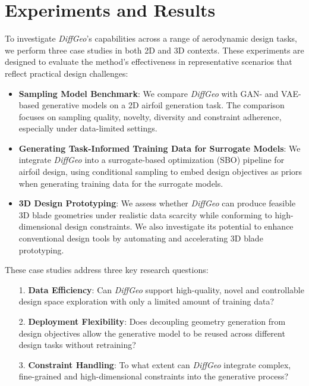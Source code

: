 \section{Experiments and Results}
\label{ch6:sec:exp}

To investigate \textit{DiffGeo}’s capabilities across a range of aerodynamic design tasks, we perform three case studies in both 2D and 3D contexts. These experiments are designed to evaluate the method’s effectiveness in representative scenarios that reflect practical design challenges:
\begin{itemize}
    \item \textbf{Sampling Model Benchmark}: We compare \textit{DiffGeo} with GAN- and VAE-based generative models on a 2D airfoil generation task. The comparison focuses on sampling quality, novelty, diversity and constraint adherence, especially under data-limited settings.

    \item \textbf{Generating Task-Informed Training Data for Surrogate Models}: We integrate \textit{DiffGeo} into a surrogate-based optimization (SBO) pipeline for airfoil design, using conditional sampling to embed design objectives as priors when generating training data for the surrogate models.

    \item \textbf{3D Design Prototyping}: We assess whether \textit{DiffGeo} can produce feasible 3D blade geometries under realistic data scarcity while conforming to high-dimensional design constraints. We also investigate its potential to enhance conventional design tools by automating and accelerating 3D blade prototyping.
\end{itemize}

These case studies address three key research questions:
\begin{itemize}
    \item[1.] \textbf{Data Efficiency}: Can \textit{DiffGeo} support high-quality, novel and controllable design space exploration with only a limited amount of training data?

    \item[2.] \textbf{Deployment Flexibility}: Does decoupling geometry generation from design objectives allow the generative model to be reused across different design tasks without retraining?

    \item[3.] \textbf{Constraint Handling}: To what extent can \textit{DiffGeo} integrate complex, fine-grained and high-dimensional constraints into the generative process?
\end{itemize}